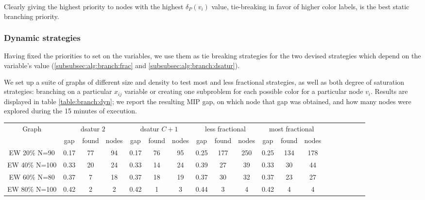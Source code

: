 Clearly giving the highest priority to nodes with the highest $\delta_P(v_i)$ value, tie-breaking in favor of higher color labels, is the best static branching priority.

\subsubsection*{Dynamic strategies}

Having fixed the priorities to set on the variables, we use them as tie breaking strategies for the two devised strategies which depend on the variable's value (\ref{subsubsec:alg:branch:frac} and \ref{subsubsec:alg:branch:dsatur}). 

We set up a suite of graphs of different size and density to test most and less fractional strategies, as well as both degree of saturation strategies: branching on a particular $x_{ij}$ variable or creating one subproblem for each possible color for a particular node $v_i$. Results are displayed in table \ref{table:branch:dyn}; we report the resulting MIP gap, on which node that gap was obtained, and how many nodes were explored during the 15 minutes of execution.

\begin{sidewaystable}
\label{table:branch:dyn}
\centering

\begin{tabular}{|c|ccc|ccc|ccc|ccc|ccc|ccc|}
\hline
\multicolumn{1}{|c|}{Graph} & \multicolumn{3}{|c|}{dsatur $2$} & \multicolumn{3}{|c|}{dsatur $C+1$} & \multicolumn{3}{|c|}{less fractional} & \multicolumn{3}{|c|}{most fractional} 
\\
 & gap & found & nodes & gap & found & nodes & gap & found & nodes & gap & found & nodes
\\
\hline
EW 20\% N=90 & 0.17 & 77 & 94 & 0.17 & 76 & 95 & 0.25 & 177 & 250 & 0.25 & 134 & 178 
\\
EW 40\% N=100 & 0.33 & 20 & 24 & 0.33 & 14 & 24 & 0.39 & 27 & 39 & 0.33 & 30 & 44 
\\
EW 60\% N=80 & 0.37 & 7 & 18 & 0.37 & 18 & 19 & 0.37 & 30 & 32 & 0.37 & 23 & 27 
\\
EW 80\% N=100 & 0.42 & 2 & 2 & 0.42 & 1 & 3 & 0.44 & 3 & 4 & 0.42 & 4 & 4
\\
\hline 
 \end{tabular}

\caption{Results for fractional and degree of saturation (spanning either $2$ or $C+1$ subproblems) branching strategies on branch and bound schemes. Data reported is MIP gap after $15$ minutes of execution, on which node (in thousands) that gap was found, and how many nodes (in thousands) were explored in total.}

\end{sidewaystable}

